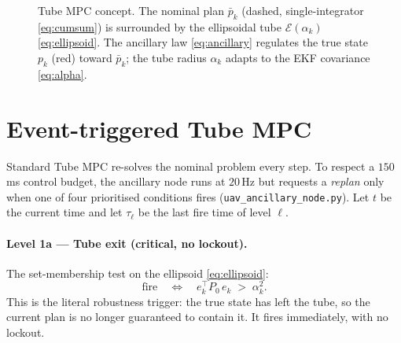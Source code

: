 \documentclass[11pt]{article}
\newcommand{\bu}{\bar{u}}
\newcommand{\bp}{\bar{p}}
\newcommand{\code}[1]{\texttt{#1}}
\begin{document}
\begin{figure}[t]
\centering
{}
\caption{Tube MPC concept. The nominal plan $\bp_k$ (dashed, single-integrator \cref{eq:cumsum}) is
surrounded by the ellipsoidal tube $\mathcal{E}(\alpha_k)$ \cref{eq:ellipsoid}. The ancillary law
\cref{eq:ancillary} regulates the true state $p_k$ (red) toward $\bp_k$; the tube radius $\alpha_k$ adapts to
the EKF covariance \cref{eq:alpha}.}
\label{fig:tube}
\end{figure}

\section{Event-triggered Tube MPC}
\label{sec:eventtrigger}

Standard Tube MPC re-solves the nominal problem every step. To respect a $150$\,ms control budget, the
ancillary node runs at $20$\,Hz but requests a \emph{replan} only when one of four prioritised conditions
fires (\code{uav\_ancillary\_node.py}). Let $t$ be the current time and let $\tau_\ell$ be the last fire time
of level $\ell$.

\paragraph{Level 1a --- Tube exit (critical, no lockout).} The set-membership test on the ellipsoid
\cref{eq:ellipsoid}:
\begin{equation}
\text{fire}\quad\Longleftrightarrow\quad e_k^\top P_0\,e_k \;>\; \alpha_k^2 .
\label{eq:trig1a}
\end{equation}
This is the literal robustness trigger: the true state has left the tube, so the current plan is no longer
guaranteed to contain it. It fires immediately, with no lockout.
\end{document}
